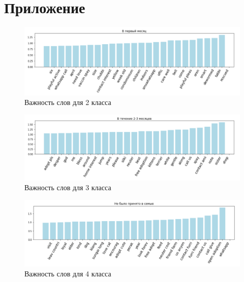 \documentclass[14pt]{mmcs_article}
\begin{document}
\newpage

\section*{Приложение}

\begin{figure}[H]
	\centering
	\includegraphics[scale=0.6]{words2.png}
	\caption{Важность слов для 2 класса}\label{text:words2}
\end{figure}

\begin{figure}[H]
	\centering
	\includegraphics[scale=0.6]{words3.png}
	\caption{Важность слов для 3 класса}\label{text:words3}
\end{figure}

\begin{figure}[H]
	\centering
	\includegraphics[scale=0.6]{words4.png}
	\caption{Важность слов для 4 класса}\label{text:words4}
\end{figure}
\end{document}
